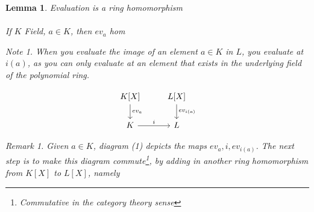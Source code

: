 \documentclass{article}
\theoremstyle{definitionstyle}
\theoremstyle{lemmastyle}
\newtheorem{lem}{Lemma}[section]
\theoremstyle{remark}
\newtheorem*{note}{Note}
\newtheorem*{remark}{Remark}
\begin{document}
\begin{lem} Evaluation is a ring homomorphism\\
\\ 
If $K$ Field, $a \in K$, then $ev_a$ hom\\

\begin{note} When you evaluate the image of an element $a \in K$ in $L$, you evaluate at $i(a)$, as you can only evaluate at an element that exists in the underlying field of the polynomial ring.\end{note}
\begin{equation}\begin{tikzcd}
K[X] \arrow[d, "ev_a"] & L[X] \arrow[d, "ev_{i(a)}"]\\
K \arrow[r, "i"]& L\end{tikzcd}\end{equation}

\begin{remark} Given $a \in K$, diagram (1) depicts the maps $ev_a, i, ev_{i(a)}$. The next step is to make this diagram commute\footnote{Commutative in the category theory sense}, by adding in another ring homomorphism from $K[X]$ to $L[X]$, namely\end{remark}\end{lem}
\end{document}
